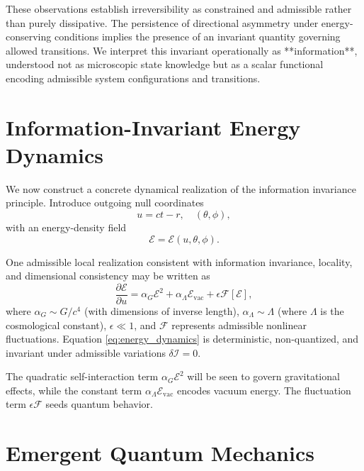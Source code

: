 \documentclass[prd,10pt,twocolumn]{revtex4-2}
\newcommand{\cE}{\mathcal{E}}
\newcommand{\cI}{\mathcal{I}}
\begin{document}
These observations establish irreversibility as constrained and admissible rather than purely dissipative. The persistence of directional asymmetry under energy-conserving conditions implies the presence of an invariant quantity governing allowed transitions. We interpret this invariant operationally as **information**, understood not as microscopic state knowledge but as a scalar functional encoding admissible system configurations and transitions.

\section{Information-Invariant Energy Dynamics}
\label{sec:dynamics}

We now construct a concrete dynamical realization of the information invariance principle. Introduce outgoing null coordinates
\begin{equation}
u = ct - r,\quad (\theta, \phi), \label{eq:null_coords}
\end{equation}
with an energy-density field
\begin{equation}
\cE = \cE(u,\theta,\phi). \label{eq:energy_field}
\end{equation}

One admissible local realization consistent with information invariance, locality, and dimensional consistency may be written as
\begin{equation}
\frac{\partial \cE}{\partial u} = \alpha_G \cE^2 + \alpha_\Lambda \cE_{\mathrm{vac}} + \epsilon \mathcal{F}[\cE], \label{eq:energy_dynamics}
\end{equation}
where $\alpha_G \sim G/c^4$ (with dimensions of inverse length), $\alpha_\Lambda \sim \Lambda$ (where $\Lambda$ is the cosmological constant), $\epsilon \ll 1$, and $\mathcal{F}$ represents admissible nonlinear fluctuations. Equation \eqref{eq:energy_dynamics} is deterministic, non-quantized, and invariant under admissible variations $\delta \cI = 0$.

The quadratic self-interaction term $\alpha_G \cE^2$ will be seen to govern gravitational effects, while the constant term $\alpha_\Lambda \cE_{\mathrm{vac}}$ encodes vacuum energy. The fluctuation term $\epsilon \mathcal{F}$ seeds quantum behavior.

\section{Emergent Quantum Mechanics}
\label{sec:quantum}
\end{document}
